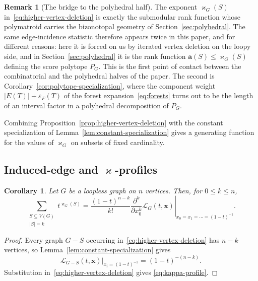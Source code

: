 \documentclass[11pt]{article}
\theoremstyle{plain}
\newtheorem{corollary}[theorem]{Corollary}
\theoremstyle{definition}
\newtheorem{remark}[theorem]{Remark}
\renewcommand{\mathcal}{\mathscr}
\newcommand{\LL}{\mathcal{L}}    %
\newcommand{\ba}{\mathbf{a}}
\newcommand{\bx}{\mathbf{x}}
\newcommand{\eps}{\varepsilon}
\newcommand{\kp}{\varkappa}
\numberwithin{equation}{section}
\begin{document}
\begin{remark}[The bridge to the polyhedral half]\label{rem:kappa-bridge}
The exponent $\kp_G(S)$ in~\eqref{eq:higher-vertex-deletion} is exactly the
submodular rank function whose polymatroid carries the bizonotopal geometry of
Section~\ref{sec:polyhedral}.  The same edge-incidence statistic therefore
appears twice in this paper, and for different reasons: here it is forced on us
by iterated vertex deletion on the loopy side, and in
Section~\ref{sec:polyhedral} it is the rank function
$\ba(S)\le\kp_G(S)$ defining the score polytope $P_G$.  This is the first
point of contact between the combinatorial and the polyhedral halves of the
paper.  The second is Corollary~\ref{cor:polytope-specialization}, where the
component weight $|E(T)|+\eps_F(T)$ of the forest
expansion~\eqref{eq:forests} turns out to be the length of an interval factor
in a polyhedral decomposition of $P_G$.
\end{remark}

Combining Proposition~\ref{prop:higher-vertex-deletion} with the constant
specialization of Lemma~\ref{lem:constant-specialization} gives a generating
function for the values of $\kp_G$ on subsets of fixed cardinality.

\subsection{Induced-edge and \texorpdfstring{$\kp$}{kappa}-profiles}\label{subsec:induced-profiles}

\begin{corollary}\label{cor:kappa-profile}
Let $G$ be a loopless graph on $n$ vertices.  Then, for $0\le k\le n$,
\begin{equation}\label{eq:kappa-profile}
   \sum_{\substack{S\subseteq V(G)\\ |S|=k}}
      t^{\kp_G(S)}
   =
   \frac{(1-t)^{n-k}}{k!}
   \left.
      \frac{\partial^k}{\partial x_0^k}\LL_G(t,\bx)
   \right|_{x_0=x_1=\cdots=(1-t)^{-1}} .
\end{equation}
\end{corollary}

\begin{proof}
  Every graph $G-S$ occurring in~\eqref{eq:higher-vertex-deletion} has $n-k$ vertices,
so Lemma~\ref{lem:constant-specialization} gives
\[
   \left.
      \LL_{G-S}(t,\bx)
   \right|_{x_i=(1-t)^{-1}}
   =(1-t)^{-(n-k)}.
\]
Substitution in~\eqref{eq:higher-vertex-deletion} gives
\eqref{eq:kappa-profile}.
\end{proof}
\end{document}
